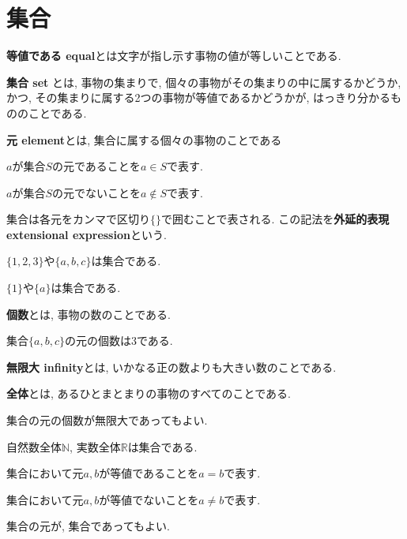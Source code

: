 \section{集合}
\begin{mean}
{\bf 等値である equal}とは文字が指し示す事物の値が等しいことである.
\end{mean}
\begin{mean}{\bf 集合 set}
とは, 事物の集まりで, 個々の事物がその集まりの中に属するかどうか, かつ, その集まりに属する2つの事物が等値であるかどうかが, はっきり分かるもののことである.
\end{mean}
\begin{mean}{\bf 元 element}とは,
集合に属する個々の事物のことである
\end{mean}

\begin{Notation}
$a$が集合$S$の元であることを$a\in S$で表す.
\end{Notation}
\begin{Notation}
$a$が集合$S$の元でないことを$a\notin S$で表す.
\end{Notation}
\begin{Notation}
集合は各元をカンマで区切り$\{\}$で囲むことで表される. この記法を{\bf 外延的表現 extensional expression}という.
\end{Notation}
\begin{example}$\{1,2,3\}$や$\{a,b,c\}$は集合である. 
\end{example}
\begin{example}$\{1\}$や$\{a\}$は集合である. 
\end{example}
\begin{mean}
{\bf 個数}とは, 事物の数のことである.
\end{mean}
\begin{example}
集合$\{a,b,c\}$の元の個数は$3$である.
\end{example}
\begin{mean}
{\bf 無限大 infinity}とは, いかなる正の数よりも大きい数のことである.
\end{mean}
\begin{mean}
{\bf 全体}とは, あるひとまとまりの事物のすべてのことである.\end{mean}
\begin{caution}
集合の元の個数が無限大であってもよい.
\end{caution}
\begin{example}
自然数全体$\mathbb{N}$, 実数全体$\mathbb{R}$は集合である.
\end{example}
\begin{Notation}
集合において元$a,b$が等値であることを$a=b$で表す.
\end{Notation}
\begin{Notation}
集合において元$a,b$が等値でないことを$a\neq b$で表す.
\end{Notation}
\begin{caution}
集合の元が, 集合であってもよい.
\end{caution}
